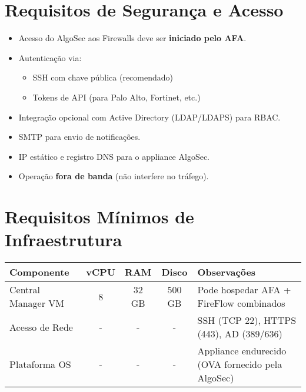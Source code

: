 \documentclass[a4paper,12pt]{article}
\begin{document}
\section*{Requisitos de Segurança e Acesso}
\begin{itemize}[leftmargin=1.5cm]
    \item Acesso do AlgoSec aos Firewalls deve ser \textbf{iniciado pelo AFA}.
    \item Autenticação via:
    \begin{itemize}
        \item SSH com chave pública (recomendado)
        \item Tokens de API (para Palo Alto, Fortinet, etc.)
    \end{itemize}
    \item Integração opcional com Active Directory (LDAP/LDAPS) para RBAC.
    \item SMTP para envio de notificações.
    \item IP estático e registro DNS para o appliance AlgoSec.
    \item Operação \textbf{fora de banda} (não interfere no tráfego).
\end{itemize}

\section*{Requisitos Mínimos de Infraestrutura}

\begin{center}
\renewcommand{\arraystretch}{1.3}
\begin{tabularx}{0.95\textwidth}{|l|c|c|c|X|}
\hline
\textbf{Componente} & \textbf{vCPU} & \textbf{RAM} & \textbf{Disco} & \textbf{Observações} \\
\hline
Central Manager VM & 8 & 32 GB & 500 GB & Pode hospedar AFA + FireFlow combinados \\
\hline
Acesso de Rede & - & - & - & SSH (TCP 22), HTTPS (443), AD (389/636) \\
\hline
Plataforma OS & - & - & - & Appliance endurecido (OVA fornecido pela AlgoSec) \\
\hline
\end{tabularx}
\end{center}
\end{document}

